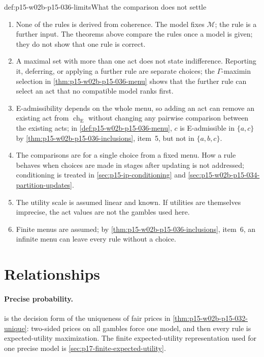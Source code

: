 \begin{hbwarning}{def:p15-w02b-p15-036-limits}{What the comparison does not settle}
\begin{enumerate}
\item None of the rules is derived from coherence. The model fixes
 \(\mathcal M\); the rule is a further input. The theorems above compare
 the rules once a model is given; they do not show that one rule is
 correct.
\item A maximal set with more than one act does not state indifference.
 Reporting it, deferring, or applying a further rule are separate choices;
 the \(\Gamma\)-maximin selection in \cref{thm:p15-w02b-p15-036-menu}
 shows that the further rule can select an act that no compatible model
 ranks first.
\item E-admissibility depends on the whole menu, so adding an act can
 remove an existing act from \(\operatorname{ch}_{\mathrm E}\) without
 changing any pairwise comparison between the existing acts; in
 \cref{def:p15-w02b-p15-036-menu}, \(c\) is E-admissible in \(\{a,c\}\)
 by \cref{thm:p15-w02b-p15-036-inclusions}, item~5, but not in
 \(\{a,b,c\}\).
\item The comparisons are for a single choice from a fixed menu. How a
 rule behaves when choices are made in stages after updating is not
 addressed; conditioning is treated in \cref{sec:p15-ip-conditioning} and
 \cref{sec:p15-w02b-p15-034-partition-updates}.
\item The utility scale is assumed linear and known. If utilities are
 themselves imprecise, the act values are not the gambles used here.
\item Finite menus are assumed; by
 \cref{thm:p15-w02b-p15-036-inclusions}, item~6, an infinite menu can
 leave every rule without a choice.
\end{enumerate}
\end{hbwarning}

\section{Relationships}
\label{sec:p15-w02b-p15-036-relations}

\paragraph{Precise probability.}
 is the decision form of the
uniqueness of fair prices in \cref{thm:p15-w02b-p15-032-unique}: two-sided
prices on all gambles force one model, and then every rule is
expected-utility maximization. The finite expected-utility representation
used for one precise model is \cref{sec:p17-finite-expected-utility}.


